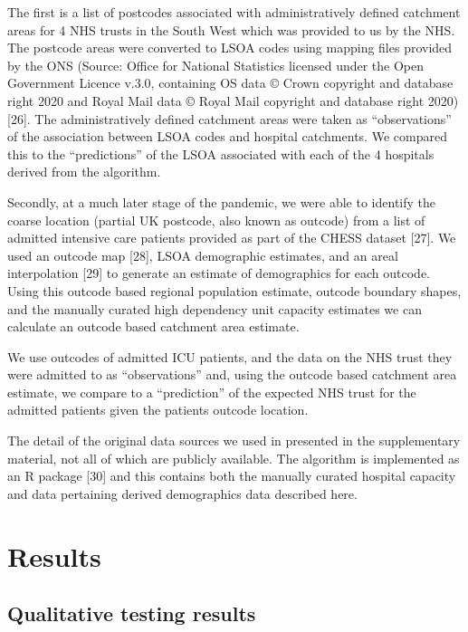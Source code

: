 \documentclass[
]{article}
\begin{document}
The first is a list of postcodes associated with administratively
defined catchment areas for 4 NHS trusts in the South West which was
provided to us by the NHS. The postcode areas were converted to LSOA
codes using mapping files provided by the ONS (Source: Office for
National Statistics licensed under the Open Government Licence v.3.0,
containing OS data © Crown copyright and database right 2020 and Royal
Mail data © Royal Mail copyright and database right 2020) {[}26{]}. The
administratively defined catchment areas were taken as ``observations''
of the association between LSOA codes and hospital catchments. We
compared this to the ``predictions'' of the LSOA associated with each of
the 4 hospitals derived from the algorithm.

Secondly, at a much later stage of the pandemic, we were able to
identify the coarse location (partial UK postcode, also known as
outcode) from a list of admitted intensive care patients provided as
part of the CHESS dataset {[}27{]}. We used an outcode map {[}28{]},
LSOA demographic estimates, and an areal interpolation {[}29{]} to
generate an estimate of demographics for each outcode. Using this
outcode based regional population estimate, outcode boundary shapes, and
the manually curated high dependency unit capacity estimates we can
calculate an outcode based catchment area estimate.

We use outcodes of admitted ICU patients, and the data on the NHS trust
they were admitted to as ``observations'' and, using the outcode based
catchment area estimate, we compare to a ``prediction'' of the expected
NHS trust for the admitted patients given the patients outcode location.

The detail of the original data sources we used in presented in the
supplementary material, not all of which are publicly available. The
algorithm is implemented as an R package {[}30{]} and this contains both
the manually curated hospital capacity and data pertaining derived
demographics data described here.

\hypertarget{results}{%
\section{Results}\label{results}}

\hypertarget{qualitative-testing-results}{%
\subsection{Qualitative testing
results}\label{qualitative-testing-results}}
\end{document}
